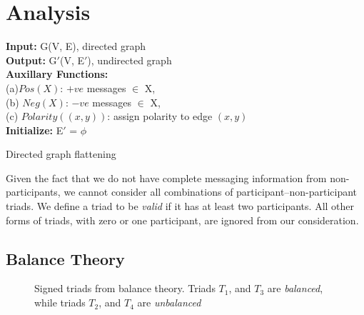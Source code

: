 \section{Analysis}
\label{sec:analysis}
\begin{algorithm}
\SetAlgoLined
\textbf{Input:} G(V, E), directed graph\\
\textbf{Output:} G$'$(V, E$'$), undirected graph\\
\textbf{Auxillary Functions:} \\
(a)$Pos(X)$: $+ve$ messages $\in$ X, \\
(b) $Neg(X)$: $-ve$ messages $\in$ X, \\
(c) $Polarity((x, y))$: assign polarity to edge $(x, y)$\\ 
\textbf{Initialize: }E$'$ = $\phi$\\
\caption{Directed graph flattening}
\label{algo:directedToUndirected}
\end{algorithm}

Given the fact that we do not have complete messaging information from non-participants, we cannot consider all combinations of participant--non-participant triads. 
We define a triad to be \textit{valid} if it has at least two participants. 
All other forms of triads, with zero or one participant, are ignored from our consideration. 
\subsection{Balance Theory}
\begin{figure}[h]
\centering
{}
\quad
{}

\quad
{}
\caption{Signed triads from balance theory. Triads $T_1$, and $T_3$ are \textit{balanced}, while triads $T_2$, and $T_4$ are \textit{unbalanced}}
\label{fig:balanceT}
\end{figure}

